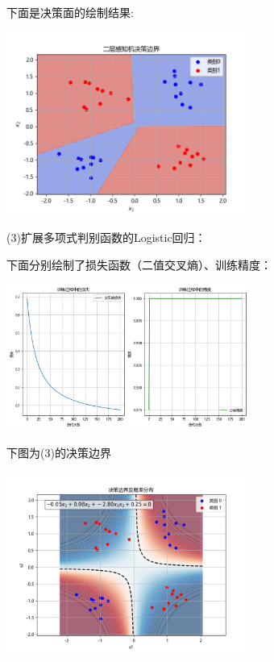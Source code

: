 \documentclass{article}
\begin{document}
下面是决策面的绘制结果:
\begin{center}
    \includegraphics[width=0.6\textwidth]{T3(2)的决策边界.png}
    \label{fig:image4}
\end{center}
(3)扩展多项式判别函数的Logistic回归：

下面分别绘制了损失函数（二值交叉熵）、训练精度：
\begin{center}
    \includegraphics[width=0.6\textwidth]{T3(3)多项式logistic回归.png}
    \label{fig:image5}
\end{center}

下图为(3)的决策边界
\begin{center}
    \includegraphics[width=0.6\textwidth]{T3(3)的决策边界.png}
    \label{fig:image6}
\end{center}
\end{document}
